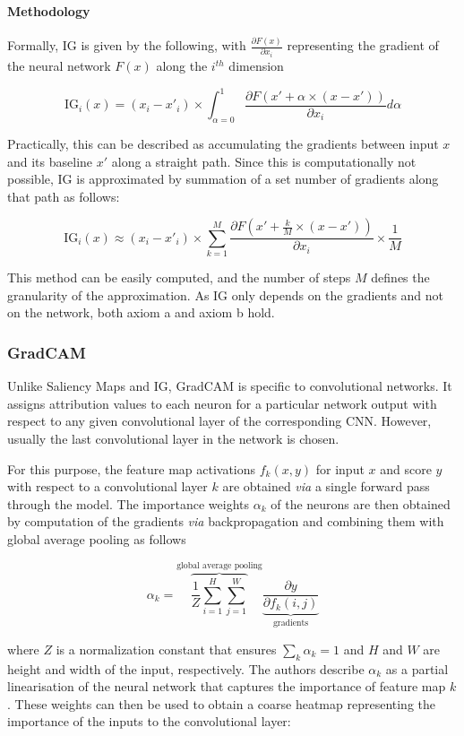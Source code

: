 \paragraph{Methodology}

Formally, IG is given by the following, with \(\frac{\partial F(x)}{\partial x_i}\) representing the gradient of the neural network \(F(x)\) along the \(i^{th}\) dimension

\[
\text{IG}_i(x) = (x_i - x'_i) \times \int_{\alpha=0}^1 \frac{\partial F(x' + \alpha \times (x - x'))}{\partial x_i} d\alpha
\]

Practically, this can be described as accumulating the gradients between input \(x\) and its baseline \(x'\) along a straight path. Since this is computationally not possible, IG is approximated by summation of a set number of gradients along that path as follows:

\[
\text{IG}_i(x) \approx (x_i - x'_i) \times  \sum_{k=1}^M \frac{\partial F(x' + \frac{k}{M} \times (x - x'))}{\partial x_i} \times \frac{1}{M}
\]

This method can be easily computed, and the number of steps \(M\) defines the granularity of the approximation. As IG only depends on the gradients and not on the network, both axiom a and axiom b hold. \cite{Sundararajan2017Axiomatic}

\subsubsection{GradCAM}

Unlike Saliency Maps and IG, GradCAM is specific to convolutional networks. It assigns attribution values to each neuron for a particular network output with respect to any given convolutional layer of the corresponding CNN. However, usually the last convolutional layer in the network is chosen. 

For this purpose, the feature map activations $f_k(x, y)$ for input \(x\) and score \(y\) with respect to a convolutional layer \(k\) are obtained \textit{via} a single forward pass through the model. The importance weights \(\alpha_k\) of the neurons are then obtained by computation of the gradients \textit{via} backpropagation and combining them with global average pooling as follows

\[
\alpha_k = \overbrace{\frac{1}{Z}\sum_{i=1}^H\sum_{j=1}^W}^{\text{global average pooling}} \underbrace{\frac{\partial y}{\partial f_k(i, j)}}_{\text{gradients}}
\]

where \(Z\) is a normalization constant that ensures \(\sum_k \alpha_k = 1\) and \(H\) and \(W\) are height and width of the input, respectively. The authors describe \(\alpha_k\) as a partial linearisation of the neural network that captures the importance of feature map \(k\). These weights can then be used to obtain a coarse heatmap representing the importance of the inputs to the convolutional layer:

